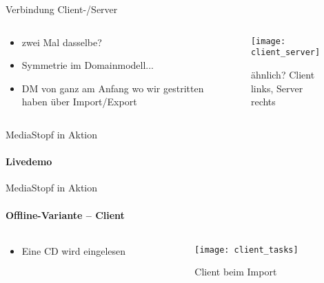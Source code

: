 \documentclass[]{beamer}
\begin{document}
\begin{frame}{Verbindung Client-/Server}
\begin{columns}[t]
\begin{column}{3cm}
  \begin{itemize}
   \item zwei Mal dasselbe?
   \item Symmetrie im Domainmodell...
   \item DM von ganz am Anfang wo wir gestritten haben über Import/Export
  \end{itemize}
\end{column}
\begin{column}{7cm}
  \begin{figure}
    \texttt{[image: client\_server]}
    \caption{ähnlich? Client links, Server rechts}
  \end{figure}
\end{column}
\end{columns}
\end{frame}

\begin{frame}{MediaStopf in Aktion}
\framesubtitle{Livedemo}
\end{frame}

\begin{frame}{MediaStopf in Aktion}
\framesubtitle{Offline-Variante -- Client}
\begin{columns}[t]
  \begin{column}{5cm}
    \begin{itemize}
      \item Eine CD wird eingelesen
    \end{itemize}
  \end{column}
  \begin{column}{5cm}
    \begin{figure}
      \texttt{[image: client\_tasks]}
      \caption{Client beim Import}
    \end{figure}
  \end{column}
\end{columns}
\end{frame}
\end{document}

